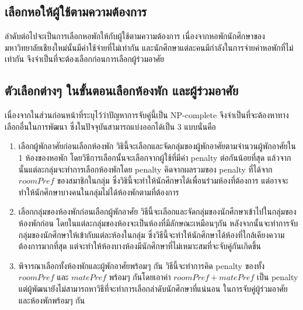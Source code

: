\subsection{เลือกหอให้ผู้ใช้ตามความต้องการ}
ลำดับต่อไปจะเป็นการเลือกหอพักให้กับผู้ใช้ตามความต้องการ เนื่องจากหอพักนักศึกษาของมหาวิทยาลัยเชียงใหม่นั้นมีค่าใช้จ่ายที่ไม่เท่ากัน
และนักศึกษาแต่ละคนมีกำลังในการจ่ายค่าหอพักที่ไม่เท่ากัน จึงจำเป็นที่จะต้องเลือกก่อนการเลือกผู้ร่วมอาศัย 
\subsection{ตัวเลือกต่างๆ ในขั้นตอนเลือกห้องพัก และผู้ร่วมอาศัย}
เนื่องจากในส่วนก่อนหน้าที่ระบุไว้ว่าปัญหาการจับคู่นี้เป็น NP-complete จึงจำเป็นที่จะต้องหาทางเลือกอื่นในการพัฒนา 
ซึ่งในปัจจุบันสามารถแบ่งออกได้เป็น 3 แบบนั่นคือ
\begin{enumerate}
  \item เลือกผู้พักอาศัยก่อนเลือกห้องพัก
        วิธินี้จะเลือกและจัดกลุ่มของผู้พักอาศัยตามจำนวนผู้พักอาศัยใน 1 ห้องของหอพัก โดยวิธีการเลือกนั้นจะเลือกจากผู้ใช้ที่มีค่า penalty ต่อกันน้อยที่สุด
        แล้วจากนั้นแต่ละกลุ่มจะทำการเลือกห้องพักโดย penalty คิดจากผลรวมของ penalty ที่ได้จาก $roomPref$ ของสมาชิกในกลุ่ม
        ซึ่งวิธินี้จะทำให้นักศึกษาได้เพื่อนร่วมห้องที่ต้องการ แต่อาจจะทำให้นักศึกษาบางคนในกลุ่มไม่ได้ห้องพักตามที่ต้องการ
  \item เลือกกลุ่มของห้องพักก่อนเลือกผู้พักอาศัย
        วิธีนี้จะเลือกและจัดกลุ่มของนักศึกษาเข้าไปในกลุ่มของห้องพักก่อน โดยในแต่ละกลุ่มของห้องจะเป็นห้องที่มีลักษณะเหมือนๆกัน
        หลังจากนั้นจะทำการจับกลุ่มของนักศึกษาให้เข้ากับแต่ละห้องในกลุ่ม ซึ่งวิธีนี้จะทำให้นักศึกษาได้ห้องที่ใกล้เคียงความต้องการมากที่สุด 
        แต่จะทำให้ห้องบางห้องมีนักศึกษาที่ไม่เหมาะสมที่จะจับคู่กันเกิดขึ้น
  \item พิจารณาเลือกทั้งห้องพักและผู้พักอาศัยพร้อมๆ กัน
        วิธีนี้จะทำการคิด penalty ของทั้ง $roomPref$ และ $matePref$ พร้อมๆ กันโดยเอาค่า $roomPref + matePref$ เป็น penalty
        แต่ผู้พัฒนายังไม่สามารถหาวิธีที่จะทำการเลือกลำดับนักศึกษาที่แน่นอน ในการจับคู่ผู้ร่วมอาศัยและห้องพักพร้อมๆ กัน
\end{enumerate}

